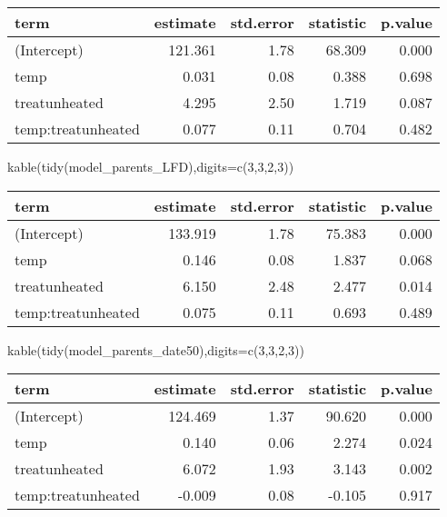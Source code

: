 \documentclass[
]{article}
\newenvironment{Shaded}{\begin{snugshade}}{\end{snugshade}}
\newcommand{\AttributeTok}[1]{\textcolor[rgb]{0.77,0.63,0.00}{#1}}
\newcommand{\DecValTok}[1]{\textcolor[rgb]{0.00,0.00,0.81}{#1}}
\newcommand{\FunctionTok}[1]{\textcolor[rgb]{0.00,0.00,0.00}{#1}}
\newcommand{\NormalTok}[1]{#1}
\begin{document}
\begin{longtable}[]{@{}lrrrr@{}}
\toprule()
term & estimate & std.error & statistic & p.value \\
\midrule()
\endhead
(Intercept) & 121.361 & 1.78 & 68.309 & 0.000 \\
temp & 0.031 & 0.08 & 0.388 & 0.698 \\
treatunheated & 4.295 & 2.50 & 1.719 & 0.087 \\
temp:treatunheated & 0.077 & 0.11 & 0.704 & 0.482 \\
\bottomrule()
\end{longtable}

\begin{Shaded}
\begin{Highlighting}[]
\FunctionTok{kable}\NormalTok{(}\FunctionTok{tidy}\NormalTok{(model\_parents\_LFD),}\AttributeTok{digits=}\FunctionTok{c}\NormalTok{(}\DecValTok{3}\NormalTok{,}\DecValTok{3}\NormalTok{,}\DecValTok{2}\NormalTok{,}\DecValTok{3}\NormalTok{))}
\end{Highlighting}
\end{Shaded}

\begin{longtable}[]{@{}lrrrr@{}}
\toprule()
term & estimate & std.error & statistic & p.value \\
\midrule()
\endhead
(Intercept) & 133.919 & 1.78 & 75.383 & 0.000 \\
temp & 0.146 & 0.08 & 1.837 & 0.068 \\
treatunheated & 6.150 & 2.48 & 2.477 & 0.014 \\
temp:treatunheated & 0.075 & 0.11 & 0.693 & 0.489 \\
\bottomrule()
\end{longtable}

\begin{Shaded}
\begin{Highlighting}[]
\FunctionTok{kable}\NormalTok{(}\FunctionTok{tidy}\NormalTok{(model\_parents\_date50),}\AttributeTok{digits=}\FunctionTok{c}\NormalTok{(}\DecValTok{3}\NormalTok{,}\DecValTok{3}\NormalTok{,}\DecValTok{2}\NormalTok{,}\DecValTok{3}\NormalTok{))}
\end{Highlighting}
\end{Shaded}

\begin{longtable}[]{@{}lrrrr@{}}
\toprule()
term & estimate & std.error & statistic & p.value \\
\midrule()
\endhead
(Intercept) & 124.469 & 1.37 & 90.620 & 0.000 \\
temp & 0.140 & 0.06 & 2.274 & 0.024 \\
treatunheated & 6.072 & 1.93 & 3.143 & 0.002 \\
temp:treatunheated & -0.009 & 0.08 & -0.105 & 0.917 \\
\bottomrule()
\end{longtable}
\end{document}

